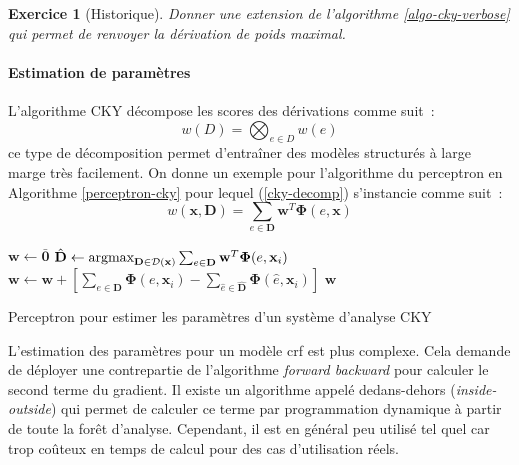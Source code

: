 \documentclass[11pt,openany]{book}
\newtheorem{exo}{Exercice}[chapter]
\begin{document}
\begin{exo}[Historique]
Donner une extension de l'algorithme \ref{algo-cky-verbose} qui permet de renvoyer la dérivation de poids maximal.
\end{exo}


\paragraph{Estimation de paramètres}
L'algorithme CKY décompose les scores des dérivations comme suit~:
\begin{equation}
\label{cky-decomp}
w(D) = \bigotimes_{e\in D} w(e) 
\end{equation}
ce type de décomposition permet d'entraîner des modèles structurés à large marge très facilement.
On donne un exemple pour l'algorithme du perceptron en Algorithme \ref{perceptron-cky} 
pour lequel (\ref{cky-decomp}) s'instancie comme suit~:
\begin{displaymath}
w(\mathbf{x},\mathbf{D}) = \sum_{e\in \mathbf{D}} \mathbf{w}^T \boldsymbol\Phi(e,\mathbf{x}) 
\end{displaymath}

\begin{algorithm}[htbp]
\begin{algorithmic}[1]
\State $\mathbf{w} \gets \bar{\mathbf{0}}$
\State
$\hat{\mathbf{D}} \gets \mathop{\text{argmax}}_{\mathbf{D}\in
  \mathbf{\cal D}(\mathbf{x})} 
\sum_{e\in \mathbf{D}} \mathbf{w}^T \boldsymbol\Phi(e,\mathbf{x}_i)$
     \State $\mathbf{w} \gets  \mathbf{w} +
     \left[ \sum_{e\in \mathbf{D}} \boldsymbol\Phi(e,\mathbf{x}_i) 
       - \sum_{\hat{e} \in \hat{\mathbf{D}}} \boldsymbol\Phi(\hat{e},\mathbf{x}_i)   \right]$ 
\EndIf
\EndFor
\EndFor
\State \Return $\mathbf{w}$
\EndFunction
\end{algorithmic}
\caption{\label{perceptron-cky}Perceptron pour estimer les paramètres d'un système d'analyse
  CKY}
\end{algorithm}

L'estimation des paramètres pour un modèle {\sc crf} est plus complexe. 
Cela demande de déployer une contrepartie de l'algorithme
{\em forward backward} pour calculer le second terme du gradient. Il existe un algorithme appelé dedans-dehors
({\em inside-outside}) qui permet de calculer ce terme par programmation dynamique à partir de toute la forêt d'analyse. 
Cependant, il est en général peu utilisé tel quel car trop coûteux en temps de calcul pour des cas d'utilisation réels. 
\end{document}
